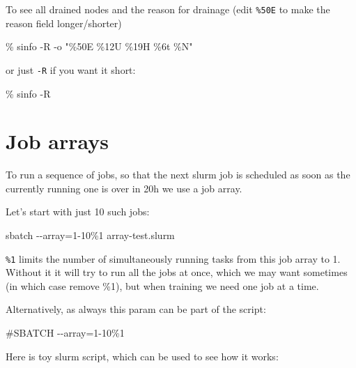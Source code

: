 \documentclass[
]{report}
\newenvironment{Shaded}{\begin{snugshade}}{\end{snugshade}}
\newcommand{\AttributeTok}[1]{\textcolor[rgb]{0.40,0.45,0.13}{#1}}
\newcommand{\CommentTok}[1]{\textcolor[rgb]{0.37,0.37,0.37}{#1}}
\newcommand{\ExtensionTok}[1]{\textcolor[rgb]{0.00,0.23,0.31}{#1}}
\newcommand{\NormalTok}[1]{\textcolor[rgb]{0.00,0.23,0.31}{#1}}
\newcommand{\OperatorTok}[1]{\textcolor[rgb]{0.37,0.37,0.37}{#1}}
\newcommand{\StringTok}[1]{\textcolor[rgb]{0.13,0.47,0.30}{#1}}
\begin{document}
To see all drained nodes and the reason for drainage (edit
\texttt{\%50E} to make the reason field longer/shorter)

\begin{Shaded}
\begin{Highlighting}[]
\ExtensionTok{\%}\NormalTok{ sinfo }\AttributeTok{{-}R} \AttributeTok{{-}o} \StringTok{"\%50E \%12U \%19H \%6t \%N"}
\end{Highlighting}
\end{Shaded}

or just \texttt{-R} if you want it short:

\begin{Shaded}
\begin{Highlighting}[]
\ExtensionTok{\%}\NormalTok{ sinfo }\AttributeTok{{-}R}
\end{Highlighting}
\end{Shaded}

\section{Job arrays}\label{job-arrays}

To run a sequence of jobs, so that the next slurm job is scheduled as
soon as the currently running one is over in 20h we use a job array.

Let's start with just 10 such jobs:

\begin{Shaded}
\begin{Highlighting}[]
\ExtensionTok{sbatch} \AttributeTok{{-}{-}array}\OperatorTok{=}\NormalTok{1{-}10\%1 array{-}test.slurm}
\end{Highlighting}
\end{Shaded}

\texttt{\%1} limits the number of simultaneously running tasks from this
job array to 1. Without it it will try to run all the jobs at once,
which we may want sometimes (in which case remove \%1), but when
training we need one job at a time.

Alternatively, as always this param can be part of the script:

\begin{Shaded}
\begin{Highlighting}[]
\CommentTok{\#SBATCH {-}{-}array=1{-}10\%1}
\end{Highlighting}
\end{Shaded}

Here is toy slurm script, which can be used to see how it works:
\end{document}
